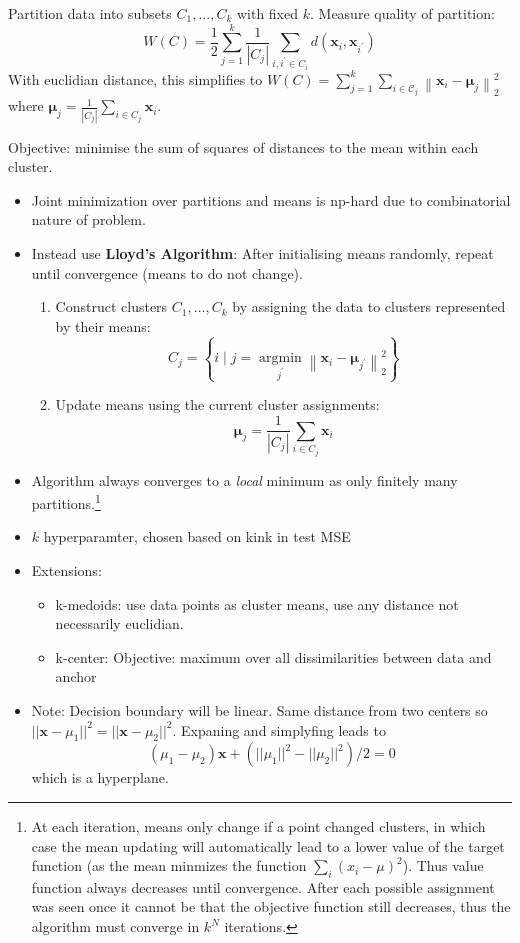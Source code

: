 \documentclass[11pt, %
	oneside, %
	english, %
	onehalfspacing, %
	parskip, %
	]{article} %
\theoremstyle{definition}
\begin{document}
Partition data into subsets $C_1, ..., C_k$ with fixed $k$. Measure quality of partition:
\begin{equation*}
	W(C)=\frac{1}{2} \sum_{j=1}^k \frac{1}{\left|C_j\right|} \sum_{i, i^{\prime} \in C_i} d\left(\mathbf{x}_i, \mathbf{x}_{i^{\prime}}\right)
\end{equation*}
With euclidian distance, this simplifies to $W(C)=\sum_{j=1}^k \sum_{i \in \mathcal{C}_j}\left\|\mathbf{x}_i-\boldsymbol{\mu}_j\right\|_2^2$ where $\boldsymbol{\mu}_j=\frac{1}{\left|C_j\right|} \sum_{i \in C_j} \mathbf{x}_i$.

Objective: minimise the sum of squares of distances to the mean within each cluster.
\begin{itemize}
	\item Joint minimization over partitions and means is np-hard due to combinatorial nature of problem.
	\item Instead use \textbf{Lloyd's Algorithm}: After initialising means randomly, repeat until convergence (means to do not change).
	\begin{enumerate}
		\item Construct clusters $C_1, \ldots, C_k$ by assigning the data to clusters represented by their means:
		$$
		C_j=\left\{i \mid j=\underset{j^{\prime}}{\operatorname{argmin}}\left\|\mathbf{x}_i-\boldsymbol{\mu}_{j^{\prime}}\right\|_2^2\right\}
		$$
		\item Update means using the current cluster assignments:
		$$
		\boldsymbol{\mu}_j=\frac{1}{\left|C_j\right|} \sum_{i \in C_j} \mathbf{x}_i
		$$
	\end{enumerate}
	\item Algorithm always converges to a \emph{local} minimum as only finitely many partitions.\footnote{At each iteration, means only change if a point changed clusters, in which case the mean updating will automatically lead to a lower value of the target function (as the mean minmizes the function $\sum_i (x_i- \mu)^2$). Thus value function always decreases until convergence. After each possible assignment was seen once it cannot be that the objective function still decreases, thus the algorithm must converge in $k^N$ iterations.}
	\item $k$ hyperparamter, chosen based on kink in test MSE
	\item Extensions:
	\begin{itemize}
		\item k-medoids: use data points as cluster means, use any distance not necessarily euclidian.
		\item k-center: Objective: maximum over all dissimilarities between data and anchor
	\end{itemize}
	\item Note: Decision boundary will be linear. Same distance from two centers so $||\mathbf{x}- \mu_1||^2 = ||\mathbf{x}- \mu_2||^2$. Expaning and simplyfing leads to
	\begin{equation*}
		\left(\mu_1 - \mu_2\right) \mathbf{x}  + \left(||\mu_1||^2-||\mu_2||^2\right) / 2 = 0
	\end{equation*}
	which is a hyperplane.
\end{itemize}
\end{document}
